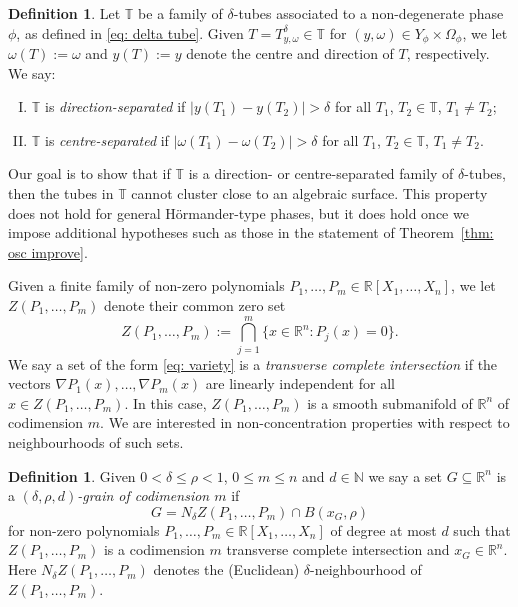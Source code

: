 \documentclass[reqno]{amsart}
\numberwithin{equation}{section}
\newcommand{\N}{\mathbb{N}}
\newcommand{\R}{\mathbb{R}}
\newcommand{\T}{\mathbb{T}}
\theoremstyle{plain}
\theoremstyle{definition}
\newtheorem{definition}[theorem]{Definition}
\begin{document}
\begin{definition} Let $\T$ be a family of $\delta$-tubes associated to a non-degenerate phase $\phi$, as defined in \eqref{eq: delta tube}. Given $T = T_{y,\omega}^{\delta} \in \T$ for $(y, \omega) \in Y_{\phi} \times \Omega_{\phi}$, we let $\omega(T) := \omega$ and $y(T) := y$ denote the centre and direction of $T$, respectively. We say:
\begin{enumerate}[I)]
    \item $\T$ is \textit{direction-separated} if $|y(T_1) - y(T_2)| > \delta$ for all $T_1$, $T_2 \in \T$, $T_1 \neq T_2$;
    \item $\T$ is \textit{centre-separated} if $|\omega(T_1) - \omega(T_2)| > \delta$ for all $T_1$, $T_2 \in \T$, $T_1 \neq T_2$.
\end{enumerate}
\end{definition}

Our goal is to show that if $\T$ is a direction- or centre-separated family of $\delta$-tubes, then the tubes in $\T$ cannot cluster close to an algebraic surface. This property does not hold for general H\"ormander-type phases, but it does hold once we impose additional hypotheses such as those in the statement of Theorem~\ref{thm: osc improve}.

Given a finite family of non-zero polynomials $P_1, \dots, P_m \in \R[X_1, \dots, X_n]$, we let $Z(P_1, \dots, P_m)$ denote their common zero set
\begin{equation}\label{eq: variety}
    Z(P_1, \dots, P_m) := \bigcap_{j=1}^m\{x \in \R^n : P_j(x) = 0 \}.
\end{equation}
We say a set of the form \eqref{eq: variety} is a \textit{transverse complete intersection} if the vectors $\nabla P_1(x), \dots, \nabla P_m(x)$ are linearly independent for all $x \in Z(P_1, \dots, P_m)$. In this case, $Z(P_1, \dots, P_m)$ is a smooth submanifold of $\R^n$ of codimension $m$. We are interested in non-concentration properties with respect to neighbourhoods of such sets.

\begin{definition} Given $0 < \delta \leq \rho < 1$, $0 \leq m \leq n$ and $d \in \N$ we say a set $G \subseteq \R^n$ is a \textit{$(\delta, \rho, d)$-grain of codimension $m$} if 
\begin{equation*}
    G = N_{\delta}Z(P_1, \dots, P_m) \cap B(x_G, \rho)
\end{equation*}
for non-zero polynomials $P_1, \dots, P_m \in \R[X_1, \dots, X_n]$ of degree at most $d$ such that $Z(P_1, \dots, P_m)$ is a codimension $m$ transverse complete intersection and $x_G \in \R^n$. Here $N_{\delta}Z(P_1, \dots, P_m)$ denotes the (Euclidean) $\delta$-neighbourhood of $Z(P_1, \dots, P_m)$.
\end{definition}
\end{document}
